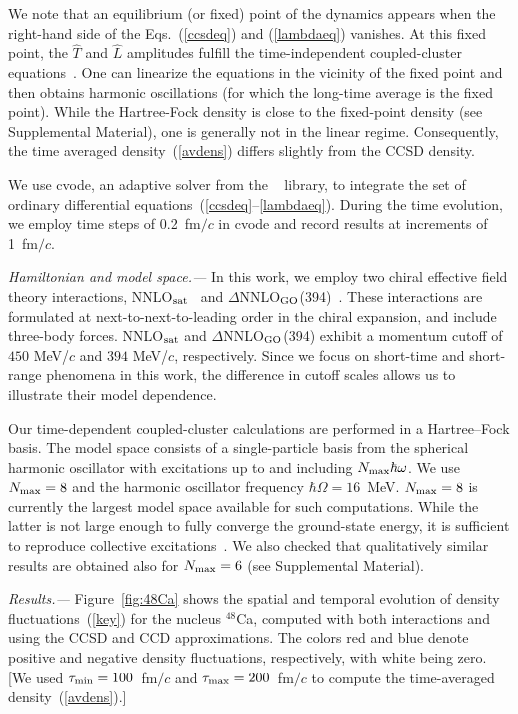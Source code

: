 \documentclass[aps,prc,twocolumn,showpacs,floatfix,nofootinbib,superscriptaddress,amsmath,amssymb,longbibliography,amsproc]{revtex4-2}
\begin{document}
We note that an equilibrium (or fixed) point of the dynamics appears when the right-hand side of the Eqs.~(\ref{ccsdeq}) and (\ref{lambdaeq}) vanishes. At this fixed point, the $\hat{T}$ and $\hat{L}$ amplitudes fulfill the time-independent coupled-cluster equations~\cite{shavittbartlett2009}. One can linearize the equations in the vicinity of the fixed point and then obtains harmonic oscillations (for which the long-time average is the fixed point). While the Hartree-Fock density is close to the fixed-point density (see Supplemental Material), one is generally not in the linear regime. Consequently, the time averaged density~(\ref{avdens}) differs slightly from the CCSD density.

We use {\sc cvode}, an adaptive solver from the {}~\cite{hindmarsh2005sundials,gardner2022sundials} library, to integrate the set of ordinary differential equations~(\ref{ccsdeq}--\ref{lambdaeq}). During the time evolution, we employ time steps of 0.2~fm$/c$ in {\sc cvode} and record results at increments of 1~fm$/c$.

\textit{Hamiltonian and model space.---} In this work, we employ two chiral effective field theory interactions, NNLO$_{\rm sat}$~\cite{ekstrom2015a} and $\Delta$NNLO$_{\rm GO}$(394)~\cite{jiang2020}. These interactions are formulated at next-to-next-to-leading order in the chiral expansion, and include three-body forces.
NNLO$_{\rm sat}$ and $\Delta$NNLO$_{\rm GO}$(394) exhibit a momentum cutoff of $450$ MeV/$c$ and $394$ MeV/$c$, respectively. Since we focus on short-time and short-range phenomena in this work, the difference in cutoff scales allows us to illustrate their model dependence.

Our time-dependent coupled-cluster calculations are performed in a Hartree–Fock basis. The model space consists of a single-particle basis from the spherical harmonic oscillator with excitations up to and including $N_{\rm max}\hbar\omega$. We use $N_{\rm max} = 8$ and the harmonic oscillator frequency $\hbar\Omega = 16$~MeV. $N_{\rm max} = 8$ is currently the largest model space available for such computations. While the latter is not large enough to fully converge the ground-state energy, it is sufficient to reproduce collective excitations~\cite{sun2024,papenbrock2024}. We also checked that qualitatively similar results are obtained also for $N_{\rm max} = 6$ (see Supplemental Material).



\textit{Results.---}
Figure~\ref{fig:48Ca} shows the spatial and temporal evolution of density fluctuations~(\ref{key}) for the nucleus $^{48}$Ca, computed with both interactions and using the CCSD and CCD approximations. The colors red and blue denote positive and negative density fluctuations, respectively, with white being zero. [We used $\tau_{\rm min} = 100$~fm$/c$ and $\tau_{\rm max} = 200$~fm$/c$ to compute the time-averaged density~(\ref{avdens}).]
\end{document}
